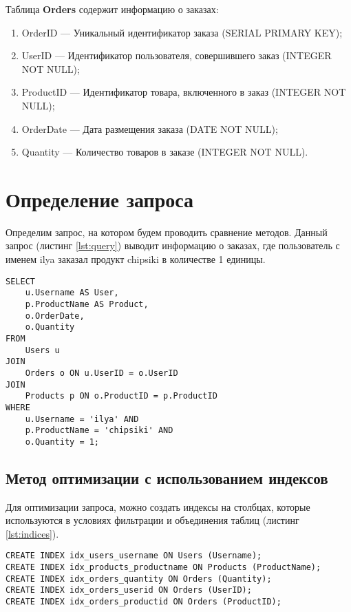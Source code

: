 \documentclass{bmstu}
\begin{document}
Таблица \textbf{Orders} содержит информацию о заказах:

\begin{enumerate}
    \item OrderID --- Уникальный идентификатор заказа (SERIAL PRIMARY KEY);
    \item UserID --- Идентификатор пользователя, совершившего заказ (INTEGER NOT NULL);
    \item ProductID --- Идентификатор товара, включенного в заказ (INTEGER NOT NULL);
    \item OrderDate --- Дата размещения заказа (DATE NOT NULL);
    \item Quantity --- Количество товаров в заказе (INTEGER NOT NULL).
\end{enumerate}

\section*{Определение запроса}
Определим запрос, на котором будем проводить сравнение методов. Данный запрос (листинг \ref{lst:query}) выводит 
информацию о заказах, где пользователь с именем ilya заказал продукт chipsiki в количестве 1 единицы.
\begin{lstlisting}[caption={Запрос к базе данных}, label=lst:query]
SELECT
    u.Username AS User,
    p.ProductName AS Product,
    o.OrderDate,
    o.Quantity
FROM
    Users u
JOIN
    Orders o ON u.UserID = o.UserID
JOIN
    Products p ON o.ProductID = p.ProductID
WHERE
    u.Username = 'ilya' AND 
    p.ProductName = 'chipsiki' AND
    o.Quantity = 1;
\end{lstlisting}
\clearpage



\subsection*{Метод оптимизации с использованием индексов}
Для оптимизации запроса, можно создать индексы на столбцах, которые используются 
в условиях фильтрации и объединения таблиц (листинг \ref{lst:indices}).

\begin{lstlisting}[caption={Создание индексов}, label=lst:indices]
CREATE INDEX idx_users_username ON Users (Username);
CREATE INDEX idx_products_productname ON Products (ProductName);
CREATE INDEX idx_orders_quantity ON Orders (Quantity);
CREATE INDEX idx_orders_userid ON Orders (UserID);
CREATE INDEX idx_orders_productid ON Orders (ProductID);
\end{lstlisting}
\end{document}
